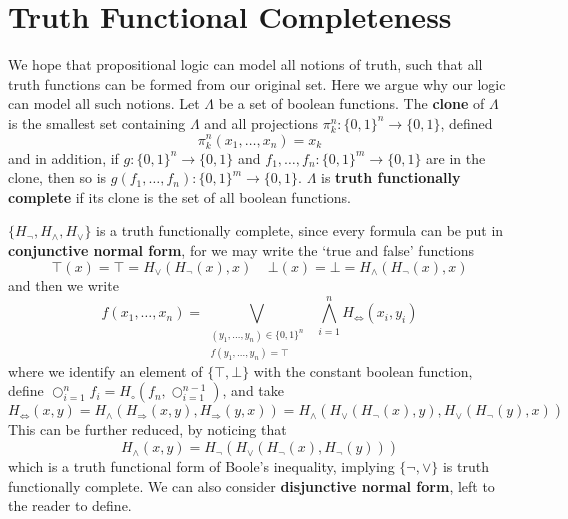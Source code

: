 \section{Truth Functional Completeness}

We hope that propositional logic can model all notions of truth, such that all truth functions can be formed from our original set. Here we argue why our logic can model all such notions. Let $\Lambda$ be a set of boolean functions. The {\bf clone} of $\Lambda$ is the smallest set containing $\Lambda$ and all projections $\pi^n_k : \{ 0, 1 \}^n \to \{ 0, 1 \}$, defined
%
\[ \pi^n_k(x_1, \dots, x_n) = x_k \]
%
and in addition, if $g: \{ 0, 1 \}^n \to \{ 0, 1 \}$ and $f_1, \dots, f_n : \{ 0, 1 \}^m \to \{ 0, 1 \}$ are in the clone, then so is $g(f_1, \dots, f_n): \{ 0, 1 \}^m \to \{ 0, 1 \}$. $\Lambda$ is {\bf truth functionally complete} if its clone is the set of all boolean functions.

\begin{example}
    $\{ H_\neg, H_\wedge, H_\vee \}$ is a truth functionally complete, since every formula can be put in {\bf conjunctive normal form}, for we may write the `true and false' functions
    \[ \top(x) = \top = H_\vee(H_\neg(x), x)\ \ \ \ \ \bot(x) = \bot = H_\wedge(H_\neg(x), x) \]
    and then we write
    \[ f(x_1, \dots, x_n) = \bigvee_{\substack{(y_1, \dots, y_n) \in \{ 0, 1 \}^n\\f(y_1, \dots, y_n) = \top}}\ \  \bigwedge_{i = 1}^n H_\Leftrightarrow(x_i, y_i) \]
    where we identify an element of $\{ \top, \bot \}$ with the constant boolean function, define $\bigcirc_{i = 1}^n f_i = H_\circ(f_n, \bigcirc_{i = 1}^{n-1})$, and take
    \[ H_\Leftrightarrow(x,y) = H_\wedge(H_\Rightarrow(x,y), H_\Rightarrow(y,x)) = H_\wedge(H_\vee(H_\neg(x), y), H_\vee(H_\neg(y), x)) \]
    This can be further reduced, by noticing that
    \[ H_\wedge(x,y) = H_\neg(H_\vee(H_\neg(x), H_\neg(y))) \]
    which is a truth functional form of Boole's inequality, implying $\{ \neg, \vee \}$ is truth functionally complete. We can also consider {\bf disjunctive normal form}, left to the reader to define.
\end{example}

